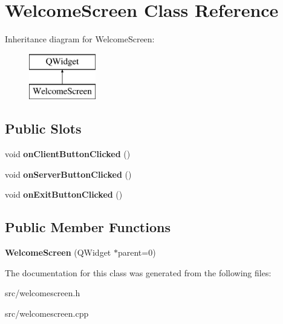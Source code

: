 \hypertarget{class_welcome_screen}{}\section{Welcome\+Screen Class Reference}
\label{class_welcome_screen}
Inheritance diagram for Welcome\+Screen\+:\begin{figure}[H]
\begin{center}
\leavevmode
\includegraphics[height=2.000000cm]{class_welcome_screen}
\end{center}
\end{figure}
\subsection*{Public Slots}
\begin{DoxyCompactItemize}
\item 
\hypertarget{class_welcome_screen_adccaa9a1534c67f1fcd43245ff689b9e}{}\label{class_welcome_screen_adccaa9a1534c67f1fcd43245ff689b9e} 
void {\bfseries on\+Client\+Button\+Clicked} ()
\item 
\hypertarget{class_welcome_screen_ad4561643cb7feb6ad60e1daa097653d8}{}\label{class_welcome_screen_ad4561643cb7feb6ad60e1daa097653d8} 
void {\bfseries on\+Server\+Button\+Clicked} ()
\item 
\hypertarget{class_welcome_screen_a587ba35bfff39970d795906f253a52f8}{}\label{class_welcome_screen_a587ba35bfff39970d795906f253a52f8} 
void {\bfseries on\+Exit\+Button\+Clicked} ()
\end{DoxyCompactItemize}
\subsection*{Public Member Functions}
\begin{DoxyCompactItemize}
\item 
\hypertarget{class_welcome_screen_a5935d49d3bc2f3aae45db144bbbd4db2}{}\label{class_welcome_screen_a5935d49d3bc2f3aae45db144bbbd4db2} 
{\bfseries Welcome\+Screen} (Q\+Widget $\ast$parent=0)
\end{DoxyCompactItemize}


The documentation for this class was generated from the following files\+:\begin{DoxyCompactItemize}
\item 
src/welcomescreen.\+h\item 
src/welcomescreen.\+cpp\end{DoxyCompactItemize}
